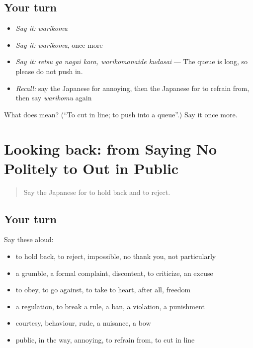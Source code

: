 \subsection*{Your turn}
\begin{itemize}
\raggedright
  \item \emph{Say it:} \emph{warikomu}
  \item \emph{Say it:} \emph{warikomu}, once more
  \item \emph{Say it:} \emph{retsu ga nagai kara, warikomanaide kudasai} — The queue is long, so please do not push in.
  \item \emph{Recall:} say the Japanese for annoying, then the Japanese for to refrain from, then say \emph{warikomu} again
\end{itemize}

\begin{tcolorbox}[breakable,colback=teal!4,colframe=teal!35!black,title={Before you move on}]
What does  mean? (\textquotedblleft{}To cut in line; to push into a queue\textquotedblright{}.) Say it once more.
\end{tcolorbox}
\section[(dialogue)]{Looking back: from Saying No Politely to Out in Public}

\label{lesson:JA-R328-review-323-328}



\begin{quote}
Say the Japanese for to hold back and to reject.
\end{quote}

\subsection*{Your turn}
Say these aloud:

\begin{itemize}
\raggedright
  \item to hold back, to reject, impossible, no thank you, not particularly
  \item a grumble, a formal complaint, discontent, to criticize, an excuse
  \item to obey, to go against, to take to heart, after all, freedom
  \item a regulation, to break a rule, a ban, a violation, a punishment
  \item courtesy, behaviour, rude, a nuisance, a bow
  \item public, in the way, annoying, to refrain from, to cut in line
\end{itemize}

